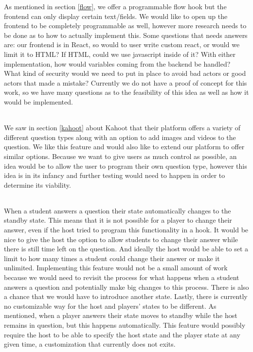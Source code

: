 \documentclass{article}
\begin{document}
    As mentioned in section \ref{flow}, we offer a programmable flow hook but the frontend can only display certain text/fields. We would like to open up the frontend to be completely programmable as well, however more research needs to be done as to how to actually implement this. Some questions that needs answers are: our frontend is in React, so would to user write custom react, or would we limit it to HTML? If HTML, could we use javascript inside of it? With either implementation, how would variables coming from the backend be handled? What kind of security would we need to put in place to avoid bad actors or good actors that made a mistake? Currently we do not have a proof of concept for this work, so we have many questions as to the feasibility of this idea as well as how it would be implemented.
    \\\\
    \smallskip
    
    We saw in section \ref{kahoot} about Kahoot that their platform offers a variety of different question types along with an option to add images and videos to the question. We like this feature and would also like to extend our platform to offer similar options. Because we want to give users as much control as possible, an idea would be to allow the user to program their own question type, however this idea is in its infancy and further testing would need to happen in order to determine its viability.
    \\\\
    \smallskip
    
    When a student answers a question their state automatically changes to the standby state. This means that it is not possible for a player to change their answer, even if the host tried to program this functionality in a hook. It would be nice to give the host the option to allow students to change their answer while there is still time left on the question. And ideally the host would be able to set a limit to how many times a student could change their answer or make it unlimited. Implementing this feature would not be a small amount of work because we would need to revisit the process for what happens when a student answers a question and potentially make big changes to this process. There is also a chance that we would have to introduce another state. Lastly, there is currently no customizable way for the host and players' states to be different. As mentioned, when a player answers their state moves to standby while the host remains in question, but this happens automatically. This feature would possibly require the host to be able to specify the host state and the player state at any given time, a customization that currently does not exits.
    \\\\
    \smallskip
    
\end{document}
